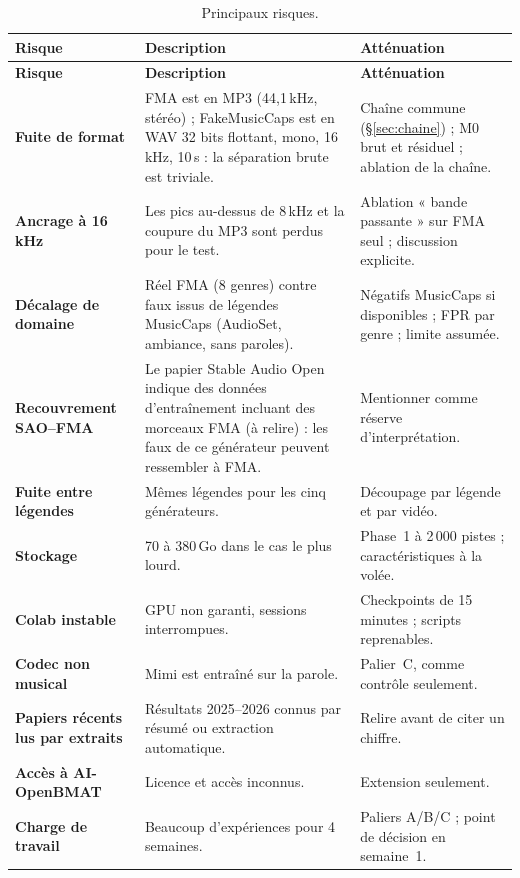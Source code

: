 \documentclass[11pt,a4paper]{article}
\begin{document}
{\small
\begin{longtable}{L{3.9cm}L{6.2cm}L{4.3cm}}
\caption{Principaux risques.}\label{tab:risques}\\
\toprule
\textbf{Risque} & \textbf{Description} & \textbf{Atténuation}\\
\midrule
\endfirsthead
\toprule
\textbf{Risque} & \textbf{Description} & \textbf{Atténuation}\\
\midrule
\endhead
\bottomrule
\endfoot
\textbf{Fuite de format} & FMA est en MP3 (44,1\,kHz, stéréo) ; FakeMusicCaps est en WAV 32 bits flottant, mono, 16\,kHz, 10\,s : la séparation brute est triviale. & Chaîne commune (\S\ref{sec:chaine}) ; M0 brut et résiduel ; ablation de la chaîne.\\
\textbf{Ancrage à 16\,kHz} & Les pics au-dessus de 8\,kHz et la coupure du MP3 sont perdus pour le test. & Ablation « bande passante » sur FMA seul ; discussion explicite.\\
\textbf{Décalage de domaine} & Réel FMA (8 genres) contre faux issus de légendes MusicCaps (AudioSet, ambiance, sans paroles). & Négatifs MusicCaps si disponibles ; FPR par genre ; limite assumée.\\
\textbf{Recouvrement SAO--FMA} & Le papier Stable Audio Open indique des données d'entraînement incluant des morceaux FMA (à relire) : les faux de ce générateur peuvent ressembler à FMA. & Mentionner comme réserve d'interprétation.\\
\textbf{Fuite entre légendes} & Mêmes légendes pour les cinq générateurs. & Découpage par légende et par vidéo.\\
\textbf{Stockage} & 70 à 380\,Go dans le cas le plus lourd. & Phase~1 à 2\,000 pistes ; caractéristiques à la volée.\\
\textbf{Colab instable} & GPU non garanti, sessions interrompues. & Checkpoints de 15 minutes ; scripts reprenables.\\
\textbf{Codec non musical} & Mimi est entraîné sur la parole. & Palier~C, comme contrôle seulement.\\
\textbf{Papiers récents lus par extraits} & Résultats 2025--2026 connus par résumé ou extraction automatique. & Relire avant de citer un chiffre.\\
\textbf{Accès à AI-OpenBMAT} & Licence et accès inconnus. & Extension seulement.\\
\textbf{Charge de travail} & Beaucoup d'expériences pour 4 semaines. & Paliers A/B/C ; point de décision en semaine~1.\\
\end{longtable}
}
\end{document}

